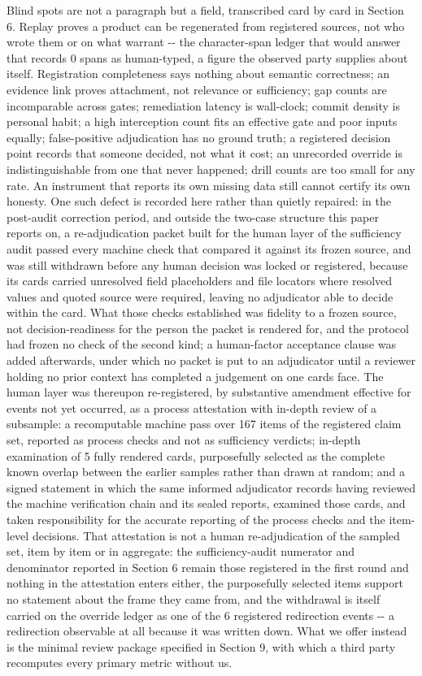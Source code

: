 \documentclass[
  english,
]{article}
\begin{document}
Blind spots are not a paragraph but a field, transcribed card by card in Section 6. Replay proves a product can be regenerated from registered sources, not who wrote them or on what warrant -\/- the character-span ledger that would answer that records 0 spans as human-typed, a figure the observed party supplies about itself. Registration completeness says nothing about semantic correctness; an evidence link proves attachment, not relevance or sufficiency; gap counts are incomparable across gates; remediation latency is wall-clock; commit density is personal habit; a high interception count fits an effective gate and poor inputs equally; false-positive adjudication has no ground truth; a registered decision point records that someone decided, not what it cost; an unrecorded override is indistinguishable from one that never happened; drill counts are too small for any rate. An instrument that reports its own missing data still cannot certify its own honesty. One such defect is recorded here rather than quietly repaired: in the post-audit correction period, and outside the two-case structure this paper reports on, a re-adjudication packet built for the human layer of the sufficiency audit passed every machine check that compared it against its frozen source, and was still withdrawn before any human decision was locked or registered, because its cards carried unresolved field placeholders and file locators where resolved values and quoted source were required, leaving no adjudicator able to decide within the card. What those checks established was fidelity to a frozen source, not decision-readiness for the person the packet is rendered for, and the protocol had frozen no check of the second kind; a human-factor acceptance clause was added afterwards, under which no packet is put to an adjudicator until a reviewer holding no prior context has completed a judgement on one card\textquotesingle s face. The human layer was thereupon re-registered, by substantive amendment effective for events not yet occurred, as a process attestation with in-depth review of a subsample: a recomputable machine pass over 167 items of the registered claim set, reported as process checks and not as sufficiency verdicts; in-depth examination of 5 fully rendered cards, purposefully selected as the complete known overlap between the earlier samples rather than drawn at random; and a signed statement in which the same informed adjudicator records having reviewed the machine verification chain and its sealed reports, examined those cards, and taken responsibility for the accurate reporting of the process checks and the item-level decisions. That attestation is not a human re-adjudication of the sampled set, item by item or in aggregate: the sufficiency-audit numerator and denominator reported in Section 6 remain those registered in the first round and nothing in the attestation enters either, the purposefully selected items support no statement about the frame they came from, and the withdrawal is itself carried on the override ledger as one of the 6 registered redirection events -\/- a redirection observable at all because it was written down. What we offer instead is the minimal review package specified in Section 9, with which a third party recomputes every primary metric without us.
\end{document}
